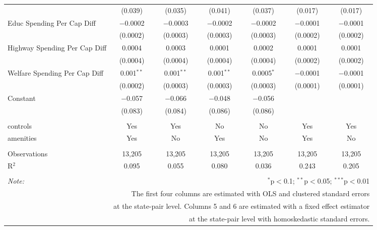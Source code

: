 \begin{table}[!htbp]
\begin{tabular}{@{\extracolsep{5pt}}lcccccc}
  & (0.039) & (0.035) & (0.041) & (0.037) & (0.017) & (0.017) \\ 
  Educ Spending Per Cap Diff & $-$0.0002 & $-$0.0003 & $-$0.0002 & $-$0.0002 & $-$0.0001 & $-$0.0001 \\ 
  & (0.0002) & (0.0003) & (0.0003) & (0.0003) & (0.0002) & (0.0002) \\ 
  Highway Spending Per Cap Diff & 0.0004 & 0.0003 & 0.0001 & 0.0002 & 0.0001 & 0.0001 \\ 
  & (0.0004) & (0.0004) & (0.0004) & (0.0004) & (0.0002) & (0.0002) \\ 
  Welfare Spending Per Cap Diff & 0.001$^{**}$ & 0.001$^{**}$ & 0.001$^{**}$ & 0.0005$^{*}$ & $-$0.0001 & $-$0.0001 \\ 
  & (0.0002) & (0.0003) & (0.0003) & (0.0003) & (0.0001) & (0.0001) \\ 
  Constant & $-$0.057 & $-$0.066 & $-$0.048 & $-$0.056 &  &  \\ 
  & (0.083) & (0.084) & (0.086) & (0.086) &  &  \\ 
 \hline \\[-1.8ex] 
controls & Yes & Yes & No & No & Yes & Yes \\ 
amenities & Yes & No & Yes & No & Yes & No \\ 
\hline \\[-1.8ex] 
Observations & 13,205 & 13,205 & 13,205 & 13,205 & 13,205 & 13,205 \\ 
R$^{2}$ & 0.095 & 0.055 & 0.080 & 0.036 & 0.243 & 0.205 \\ 
\hline 
\hline \\[-1.8ex] 
\textit{Note:}  & \multicolumn{6}{r}{$^{*}$p$<$0.1; $^{**}$p$<$0.05; $^{***}$p$<$0.01} \\ 
 & \multicolumn{6}{r}{The first four columns are estimated with OLS and clustered standard errors} \\ 
 & \multicolumn{6}{r}{at the state-pair level. Columns 5 and 6 are estimated with a fixed effect estimator} \\ 
 & \multicolumn{6}{r}{at the state-pair level with homoskedastic standard errors.} \\ 
\end{tabular} 
\end{table} 
